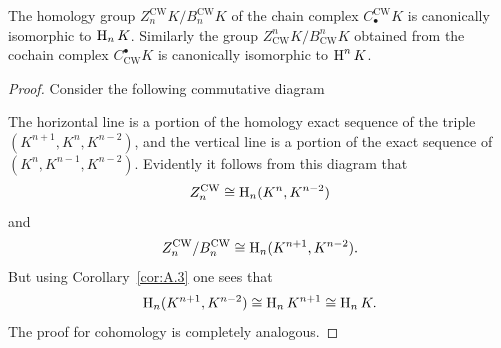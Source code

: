 \documentclass[../main]{subfiles}
\begin{document}
\begin{theorem}
The homology group $Z^{\mathrm{CW}}_n K / B^{\mathrm{CW}}_n K$ of the chain complex $C^{\mathrm{CW}}_{\bullet} K$ is canonically isomorphic to $\operatorname{H}_n K$. Similarly the group $Z_{\mathrm{CW}}^n K / B_{\mathrm{CW}}^n K$ obtained from the cochain complex $C_{\mathrm{CW}}^{\bullet} K$ is canonically isomorphic to $\operatorname{H}^n K$.
\end{theorem} 
\begin{proof}
Consider the following commutative diagram

\begin{center}
\end{center}

The horizontal line is a portion of the homology exact sequence of the triple $(K^{n+1}, K^n, K^{n-2})$, and the vertical line is a portion of the exact sequence of $(K^n, K^{n-1}, K^{n-2})$. Evidently it follows from this diagram that \[Z^{\mathrm{CW}}_n \cong \operatorname{H}_n (K^n, K^{n-2})\] and \[Z^{\mathrm{CW}}_n / B^{\mathrm{CW}}_n \cong \operatorname{H}_n (K^{n+1}, K^{n-2}).\]
But using Corollary~\ref{cor:A.3} one sees that \[\operatorname{H}_n (K^{n+1}, K^{n-2}) \cong \operatorname{H}_n K^{n+1} \cong \operatorname{H}_n K.\]
The proof for cohomology is completely analogous.
\end{proof}
\end{document}
